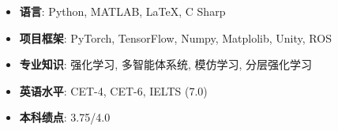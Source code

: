 \begin{itemize}[leftmargin=*]
  \item \textbf{语言}: Python, MATLAB, \LaTeX, C Sharp
  \item \textbf{项目框架}: PyTorch, TensorFlow, Numpy, Matplolib, Unity, ROS
  \item \textbf{专业知识}: 强化学习, 多智能体系统, 模仿学习, 分层强化学习
  \item \textbf{英语水平}: CET-4, CET-6, IELTS (7.0)
  \item \textbf{本科绩点}: 3.75/4.0
\end{itemize}
